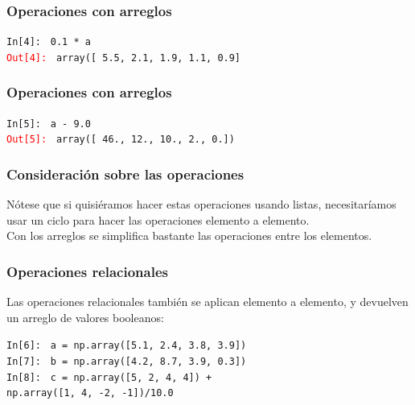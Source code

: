 \begin{frame}[fragile]
\frametitle{Operaciones con arreglos}
\begin{tcolorbox}[colback=aquamarine!30!white, colbacktitle=kellygreen, coltitle=white, fonttitle=\small, title=Multiplicamos por $0.1$ al arreglo $a$]
\fontsize{10}{10}\selectfont
\textcolor{ao}{\texttt{In[4]: }} \texttt{0.1 * a} \\
\medskip
\pause
\textcolor{red}{\texttt{Out[4]: }} \texttt{array([ 5.5,  2.1,  1.9,  1.1,  0.9]}
\end{tcolorbox}
\end{frame}
\begin{frame}[fragile]
\frametitle{Operaciones con arreglos}
\begin{tcolorbox}[colback=aquamarine!30!white, colbacktitle=kellygreen, coltitle=white, fonttitle=\small, title=Restamos $9.0$ al arreglo $a$]
\fontsize{10}{10}\selectfont
\textcolor{ao}{\texttt{In[5]: }} \texttt{a - 9.0} \\
\medskip
\pause
\textcolor{red}{\texttt{Out[5]: }} \texttt{array([ 46.,  12.,  10.,   2.,   0.])}
\end{tcolorbox}
\end{frame}
\begin{frame}[fragile]
\frametitle{Consideración sobre las operaciones}
Nótese que si quisiéramos hacer estas operaciones usando listas, necesitaríamos usar un ciclo  para hacer las operaciones elemento a elemento.
\\
\bigskip
Con los arreglos se simplifica bastante las operaciones entre los elementos.
\end{frame}
\begin{frame}[fragile]
\frametitle{Operaciones relacionales}
Las operaciones relacionales también se aplican elemento a elemento, y devuelven un arreglo de valores booleanos:
\begin{tcolorbox}[colback=aquamarine!30!white, colbacktitle=kellygreen, coltitle=white, fonttitle=\small, title=Ocuparemos tres arreglos]
\fontsize{10}{10}\selectfont
\textcolor{ao}{\texttt{In[6]: }} \texttt{a = np.array([5.1, 2.4, 3.8, 3.9])} \\
\pause
\textcolor{ao}{\texttt{In[7]: }} \texttt{b = np.array([4.2, 8.7, 3.9, 0.3])} \\
\pause
\textcolor{ao}{\texttt{In[8]: }} \texttt{c = np.array([5, 2, 4, 4]) +} \\
\hspace*{1.3cm} \texttt{np.array([1, 4, -2, -1])/10.0}
\end{tcolorbox}
\end{frame}
